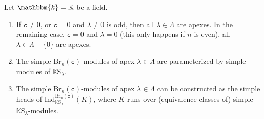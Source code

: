 \documentclass[a4paper,11pt]{amsart}
\newcommand{\setstuff}[1]{\mathrm{#1}}
\newcommand{\K}{\mathbb{K}}
\newcommand{\KK}{\mathbbm{k}}
\newcommand{\varsym}[1]{\mathtt{#1}}
\newcommand{\cvar}{\varsym{c}}
\numberwithin{equation}{section}
\begin{document}
\begin{theorem}\label{theorem:brauer}
Let $\KK=\K$ be a field.
\begin{enumerate}

\item If $\cvar\neq 0$, or $\cvar=0$ and $\lambda\neq 0$ is odd, 
then all $\lambda\in\Lambda$ are apexes. In the remaining case, 
$\cvar=0$ and $\lambda=0$ (this only happens if $n$ is even), 
all $\lambda\in\Lambda-\{0\}$ are apexes.

\item The simple $\setstuff{Br}_{n}(\cvar)$-modules of 
apex $\lambda\in\Lambda$ 
are parameterized by simple modules of $\K\setstuff{S}_{\lambda}$.

\item The simple $\setstuff{Br}_{n}(\cvar)$-modules of 
apex $\lambda\in\Lambda$ can be constructed as 
the simple heads of
$\mathrm{Ind}_{\K\setstuff{S}_{\lambda}}^{\setstuff{Br}_{n}(\cvar)}(K)$, 
where $K$ runs over (equivalence classes of) 
simple $\K\setstuff{S}_{\lambda}$-modules.

\end{enumerate}
\end{theorem}
\end{document}
